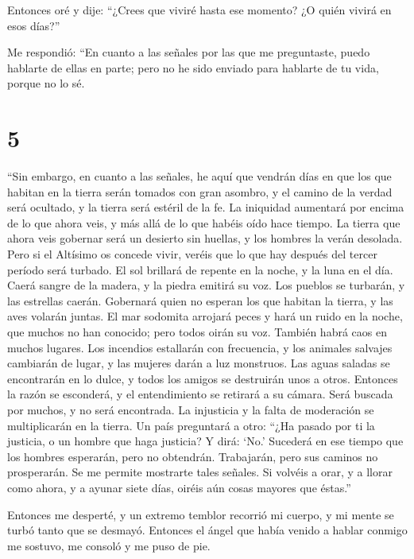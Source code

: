  Entonces oré y dije: ``¿Crees que viviré hasta ese
momento? ¿O quién vivirá en esos días?''

 Me respondió: ``En cuanto a las señales por las que me
preguntaste, puedo hablarte de ellas en parte; pero no he sido enviado
para hablarte de tu vida, porque no lo sé.

\hypertarget{section-4}{%
\section{5}\label{section-4}}

 ``Sin embargo, en cuanto a las señales, he aquí que
vendrán días en que los que habitan en la tierra serán tomados con gran
asombro, y el camino de la verdad será ocultado, y la tierra será
estéril de la fe.  La iniquidad aumentará por encima de lo
que ahora veis, y más allá de lo que habéis oído hace tiempo.
 La tierra que ahora veis gobernar será un desierto sin
huellas, y los hombres la verán desolada.  Pero si el
Altísimo os concede vivir, veréis que lo que hay después del tercer
período será turbado. El sol brillará de repente en la noche, y la luna
en el día.  Caerá sangre de la madera, y la piedra emitirá
su voz. Los pueblos se turbarán, y las estrellas caerán. 
Gobernará quien no esperan los que habitan la tierra, y las aves volarán
juntas.  El mar sodomita arrojará peces y hará un ruido en
la noche, que muchos no han conocido; pero todos oirán su voz.
 También habrá caos en muchos lugares. Los incendios
estallarán con frecuencia, y los animales salvajes cambiarán de lugar, y
las mujeres darán a luz monstruos.  Las aguas saladas se
encontrarán en lo dulce, y todos los amigos se destruirán unos a otros.
Entonces la razón se esconderá, y el entendimiento se retirará a su
cámara.  Será buscada por muchos, y no será encontrada.
La injusticia y la falta de moderación se multiplicarán en la tierra.
 Un país preguntará a otro: ``¿Ha pasado por ti la
justicia, o un hombre que haga justicia? Y dirá: `No.' 
Sucederá en ese tiempo que los hombres esperarán, pero no obtendrán.
Trabajarán, pero sus caminos no prosperarán.  Se me
permite mostrarte tales señales. Si volvéis a orar, y a llorar como
ahora, y a ayunar siete días, oiréis aún cosas mayores que éstas.''

 Entonces me desperté, y un extremo temblor recorrió mi
cuerpo, y mi mente se turbó tanto que se desmayó. 
Entonces el ángel que había venido a hablar conmigo me sostuvo, me
consoló y me puso de pie.

